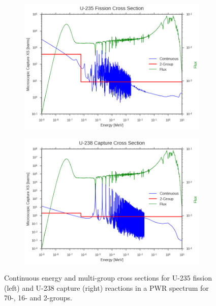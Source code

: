 \begin{figure}
\begin{subfigure}{.5\textwidth}
  \includegraphics[width=\linewidth]{figures/intro/u235-fission-2}
  \caption{}
  \label{fig:assm-neighbors}
\end{subfigure}
\begin{subfigure}{.5\textwidth}
  \centering
  \includegraphics[width=\linewidth]{figures/intro/u238-capture-2}
  \caption{}
  \label{fig:colorset-neighbors}
\end{subfigure}
\caption[Uranium-235 and Uranium-238 cross sections]{Continuous energy and multi-group cross sections for U-235 fission (left) and U-238 capture (right) reactions in a PWR spectrum for 70-, 16- and 2-groups.}
\label{fig:pwr-ce-mg-xs}
\end{figure}


